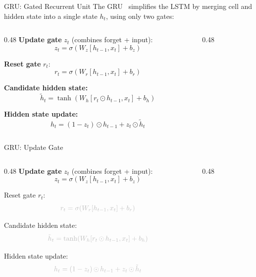\begin{frame}{GRU: Gated Recurrent Unit}
  The GRU~\cite{cho2014gru} simplifies the LSTM by merging cell and hidden state into a single state $h_t$, using only two gates:

  \vspace{0.5em}
  \begin{columns}[T]
    \begin{column}{0.48\textwidth}
      \textbf{Update gate} $z_t$ (combines forget + input):
      \[
        z_t = \sigma\!\left(W_z [h_{t-1}, x_t] + b_z\right)
      \]

      \textbf{Reset gate} $r_t$:
      \[
        r_t = \sigma\!\left(W_r [h_{t-1}, x_t] + b_r\right)
      \]

      \textbf{Candidate hidden state:}
      \[
        \tilde{h}_t = \tanh\!\left(W_h [r_t \odot h_{t-1}, x_t] + b_h\right)
      \]

      \textbf{Hidden state update:}
      \[
        \boxed{h_t = (1 - z_t) \odot h_{t-1} + z_t \odot \tilde{h}_t}
      \]
    \end{column}
    \begin{column}{0.48\textwidth}
      \begin{center}
      \end{center}
    \end{column}
  \end{columns}
\end{frame}

\begin{frame}{GRU: Update Gate}
  \begin{columns}[T]
    \begin{column}{0.48\textwidth}
      \textbf{Update gate} $z_t$ (combines forget + input):
      \[
        z_t = \sigma\!\left(W_z [h_{t-1}, x_t] + b_z\right)
      \]

      \textcolor{gray!50}{Reset gate $r_t$:}
      \[
        \textcolor{gray!50}{r_t = \sigma\!\left(W_r [h_{t-1}, x_t] + b_r\right)}
      \]

      \textcolor{gray!50}{Candidate hidden state:}
      \[
        \textcolor{gray!50}{\tilde{h}_t = \tanh\!\left(W_h [r_t \odot h_{t-1}, x_t] + b_h\right)}
      \]

      \textcolor{gray!50}{Hidden state update:}
      \[
        \textcolor{gray!50}{h_t = (1 - z_t) \odot h_{t-1} + z_t \odot \tilde{h}_t}
      \]
    \end{column}
    \begin{column}{0.48\textwidth}
      \begin{center}
      \end{center}
    \end{column}
  \end{columns}
\end{frame}

